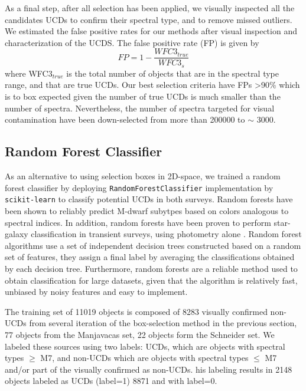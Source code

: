 \documentclass[manuscript]{aastex63}
\begin{document}
As a final step, after all selection has been applied, we visually inspected all the candidates UCDs to confirm their spectral type, and to remove missed outliers. We estimated the false positive rates for our methods after visual inspection and characterization of the UCDS. The false positive rate (FP) is given by \begin{equation}
FP=1-\frac{WFC3_{true}}{WFC3_{s}}
\end{equation} where WFC3$_{true}$ is the total number of objects that are in the spectral type range, and that are true UCDs. Our best selection criteria have FPs \textgreater 90\% which is to box expected given the number of true UCDs is much smaller than the number of spectra. Nevertheless, the number of spectra targeted for visual contamination have been down-selected from more than 200000 to $\sim$ 3000. 


\subsection{Random Forest Classifier}
As an alternative to using selection boxes in 2D-space, we trained a random forest classifier by deploying \texttt{RandomForestClassifier} implementation by \texttt{scikit-learn} \citep{2012arXiv1201.0490P} to classify potential UCDs in both surveys. Random forests have been shown to reliably predict M-dwarf subytpes based on colors \citep{2019arXiv190505900H} analogous to spectral indices. In addition, random forests have been proven to perform star-galaxy classification in transient surveys, using photometry alone \citep{2017AJ....153...73M}. Random forest algorithms use a set of independent decision trees constructed based on a random set of features, they assign a final label by averaging the classifications obtained by each decision tree. Furthermore, random forests are a reliable method used to obtain classification for large datasets, given that the algorithm is relatively fast, unbiased by noisy features and easy to implement.

 The training set of 11019 objects is composed of 8283 visually confirmed non-UCDs from several iteration of the box-selection method in the previous section, 77 objects from the Manjavacas set, 22 objects form the Schneider set. We labeled these sources using two labels: UCDs, which are objects with spectral types $\geq$ M7, and non-UCDs which are objects with spectral types $\leq$ M7 and/or part of the visually confirmed as non-UCDs.  his labeling results in 2148 objects labeled as UCDs (label=1) 8871 and with label=0. 
\end{document}
